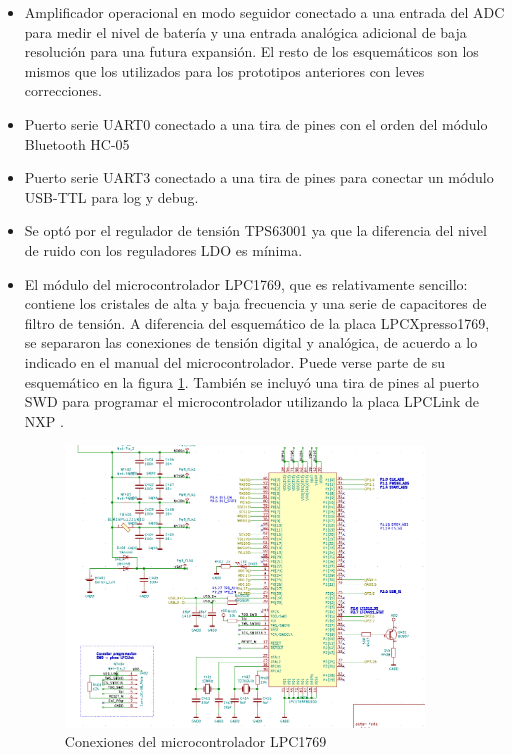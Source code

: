 \begin{itemize}

\item Amplificador operacional en modo seguidor conectado a una entrada del ADC para medir el nivel de batería y una entrada analógica adicional de baja resolución para una futura expansión. El resto de los esquemáticos son los mismos que los utilizados para los prototipos anteriores con leves correcciones.

\item Puerto serie UART0 conectado a una tira de pines con el orden del módulo Bluetooth HC-05

\item Puerto serie UART3 conectado a una tira de pines para conectar un módulo USB-TTL para log y debug.

\item Se optó por el regulador de tensión TPS63001 ya que la diferencia del nivel de ruido con los reguladores LDO es mínima.

\item El módulo del microcontrolador LPC1769, que es relativamente sencillo: contiene los cristales de alta y baja frecuencia y una serie de capacitores de filtro de tensión. A diferencia del esquemático de la placa LPCXpresso1769, se separaron las conexiones de tensión digital y analógica, de acuerdo a lo indicado en el manual del microcontrolador. Puede verse parte de su esquemático en la figura \ref{fig:esqlpc1769}. También 
se incluyó una tira de pines al puerto SWD para programar el microcontrolador utilizando la placa LPCLink de NXP \citep{nxp2013}.


\begin{figure}[!htbp]
	\centering	
	\includegraphics[width=0.9\textwidth]{./Figures/esqlpc1769.png}			
	\caption{Conexiones del microcontrolador LPC1769}
	\label{fig:esqlpc1769}
\end{figure}

\end{itemize}


